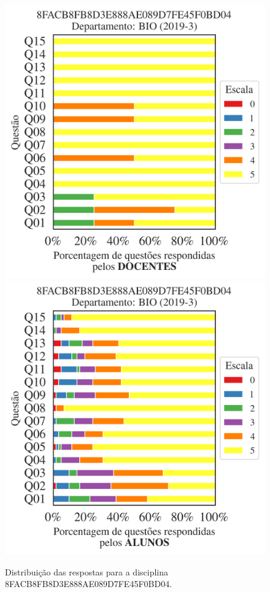 \documentclass[a4paper,10pt]{article}
\begin{document}
\begin{figure}[h]
\centering
\includegraphics[width=0.485\linewidth]{analise_disciplina_departamento_BIO_8FACB8FB8D3E888AE089D7FE45F0BD04_docentes.png}
\includegraphics[width=0.485\linewidth]{analise_disciplina_departamento_BIO_8FACB8FB8D3E888AE089D7FE45F0BD04_alunos.png}
\caption{\label{fig:analise_geral_departamento}                Distribuição das respostas para a disciplina 8FACB8FB8D3E888AE089D7FE45F0BD04. }
\end{figure}
\end{document}
